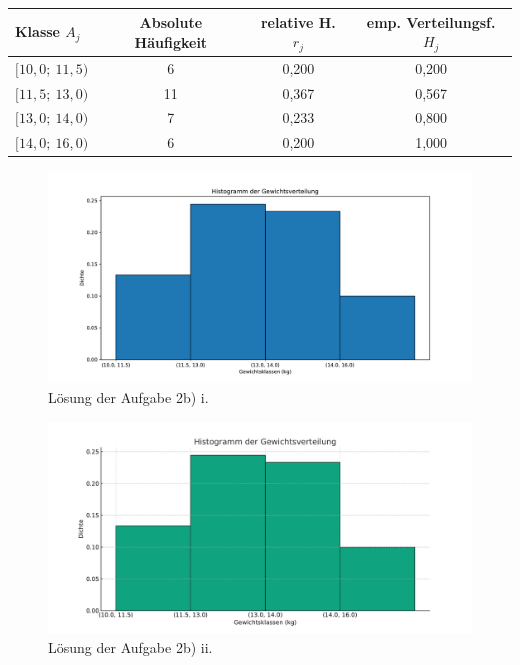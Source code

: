 \documentclass[main.tex]{subfiles}
\begin{document}
\begin{center}
\begin{tabular}{l|c|c|c}
Klasse $A_j$  & Absolute Häufigkeit & relative H. $r_j$     & emp. Verteilungsf. $H_j$ \\\hline
$[10,0;\  11,5)$  & 6                   & 0,200               & 0,200                    \\
$[11,5;\  13,0)$  & 11                  & 0,367               & 0,567                    \\
$[13,0;\  14,0)$  & 7                   & 0,233               & 0,800                    \\
$[14,0;\  16,0)$  & 6                   & 0,200               & 1,000                    \\
\end{tabular}
\end{center}

\begin{figure}[h!]
    \begin{center}
        \includegraphics[width=1\textwidth]{A2-b.pdf}
        \caption{Lösung der Aufgabe 2b) i.}
    \end{center}
\end{figure}

\begin{figure}[h!]
    \begin{center}
        \includegraphics[width=1\textwidth, page=2]{Gewichtsverteilung_Versuchstiere.pdf}
        \caption{Lösung der Aufgabe 2b) ii.}
    \end{center}
\end{figure}
\end{document}
